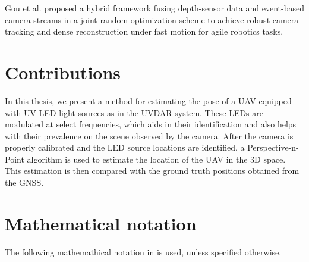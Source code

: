 Gou et al. \cite{GOU2025328} proposed a hybrid framework fusing depth-sensor data and event-based camera streams in a joint random-optimization scheme to achieve robust camera tracking and dense reconstruction under fast motion for agile robotics tasks.

\section{Contributions}

In this thesis, we present a method for estimating the pose of a \ac{UAV} equipped with \ac{UV} \ac{LED} light sources as in the UVDAR system. \cite{walteruvdar}
These \ac{LED}s are modulated at select frequencies, which aids in their identification and also helps with their prevalence
on the scene observed by the camera. After the camera is properly calibrated and the LED source locations are identified, a Perspective-n-Point 
algorithm is used to estimate the location of the \ac{UAV} in the 3D space. This estimation is then compared with the ground truth positions obtained
from the \ac{GNSS}.

\section{Mathematical notation}


The following mathemathical notation in  is used, unless specified otherwise.

